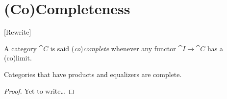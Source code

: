 
\section{(Co)Completeness}

[Rewrite]

\begin{definition}
A category \(\cat C\) is said ({\em co}){\em complete} whenever any functor \(\cat I \to \cat C\) has a (co)limit.
\end{definition}

\begin{proposition}\label{proposition:Completeness}
Categories that have products and equalizers are complete. 
\end{proposition}

\begin{proof}
Yet to write\dots{}
\end{proof}
